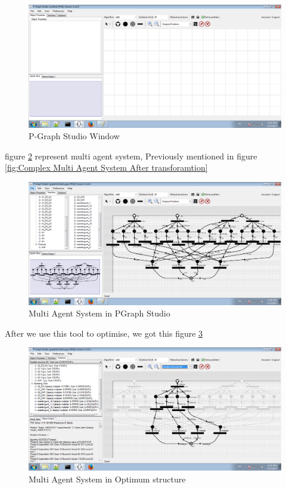 \begin{figure}[th]
	\centering  %
 	\includegraphics[scale=0.44]{ch3/img/pgraph}
	\caption{\label{fig:pgraphstudio)}P-Graph Studio Window }
\end{figure}  


figure \ref{fig:Multi Agent System in PGraph Studio} represent multi agent system, Previously mentioned in figure \ref{fig:Complex Multi Agent System After transforamtion} 
\begin{figure}[th]
	\centering
		\includegraphics[scale=0.44]{ch3/img/pgraphArt}
	\caption{\label{fig:Multi Agent System in PGraph Studio}Multi Agent System in PGraph Studio}
\end{figure} 
\pagebreak
After we use this tool to optimise, we got this figure \ref{fig:Multi Agent System in Optimum structure}

\begin{figure}[th]
	\centering
		\includegraphics[scale=0.44]{ch3/img/pgraphSol}
	\caption{\label{fig:Multi Agent System in Optimum structure}Multi Agent System in Optimum structure}
\end{figure} 

